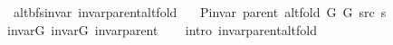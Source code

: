 \begin{isabellebody}
{}
\isamarkuptrue%
%
\endisatagdocument
{\isafolddocument}%
%
\isadelimdocument
%
\endisadelimdocument
{}\isamarkupfalse%
\ {\isacharparenleft}{\kern0pt}\ alt{\isacharunderscore}{\kern0pt}bfs{\isacharunderscore}{\kern0pt}invar{\isacharparenright}{\kern0pt}\ invar{\isacharunderscore}{\kern0pt}parent{\isacharunderscore}{\kern0pt}alt{\isacharunderscore}{\kern0pt}fold{\isacharcolon}{\kern0pt}\isanewline
\ \ \ {\isachardoublequoteopen}P{\isacharunderscore}{\kern0pt}invar\ {\isacharparenleft}{\kern0pt}parent\ {\isacharparenleft}{\kern0pt}alt{\isacharunderscore}{\kern0pt}fold\ G{}\ G{}\ src\ s{\isacharparenright}{\kern0pt}{\isacharparenright}{\kern0pt}{\isachardoublequoteclose}\isanewline
%
\isadelimproof
\ \ %
\endisadelimproof
%
\isatagproof
{}\isamarkupfalse%
\ invar{\isacharunderscore}{\kern0pt}G{}\ invar{\isacharunderscore}{\kern0pt}G{}\ invar{\isacharunderscore}{\kern0pt}parent\isanewline
\ \ \isamarkupfalse%
\ {\isacharparenleft}{\kern0pt}intro\ invar{\isacharunderscore}{\kern0pt}parent{\isacharunderscore}{\kern0pt}alt{\isacharunderscore}{\kern0pt}fold{\isacharparenright}{\kern0pt}%
\endisatagproof
{\isafoldproof}%
%
\isadelimproof
%
\endisadelimproof
%
\isadelimdocument
%
\endisadelimdocument
%
\isatagdocument
%

\end{isabellebody}
